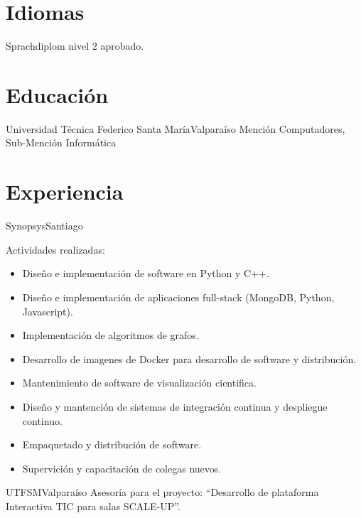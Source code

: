 \documentclass[11pt,letterpaper,sans]{moderncv}
\begin{document}
  \makecvtitle{}

  \section{Idiomas}
      {Sprachdiplom nivel 2 aprobado.}

  \section{Educación}
      {Universidad Técnica Federico Santa María}{Valparaíso}
      {}
      {Mención Computadores, Sub-Mención Informática}


  \section{Experiencia}
    {Synopsys}{Santiago}{}
    {
      Actividades realizadas:
      \begin{itemize}
        \item Diseño e implementación de software en Python y C++.
        \item Diseño e implementación de aplicaciones full-stack (MongoDB, Python, Javascript).
        \item Implementación de algoritmos de grafos.
        \item Desarrollo de imagenes de Docker para desarrollo de software y distribución.
        \item Mantenimiento de software de visualización cientifica.
        \item Diseño y mantención de sistemas de integración continua y despliegue continuo.
        \item Empaquetado y distribución de software.
        \item Supervición y capacitación de colegas nuevos.
      \end{itemize}
    }

    \pagebreak[0]

    {UTFSM}{Valparaíso}{}
    {
      Asesoría para el proyecto: ``Desarrollo de plataforma
      Interactiva TIC para salas SCALE-UP''.
    }
\end{document}

